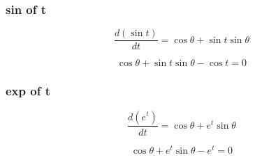 \documentclass{article}
\begin{document}
\subsubsection{sin of t}

\begin{equation}
    \frac{d(\sin t)}{dt} = \cos \theta + \sin t \sin \theta
\end{equation}

\begin{equation}
     \cos \theta + \sin t \sin \theta - \cos t = 0
\end{equation}

\subsubsection{exp of t}

\begin{equation}
    \frac{d(e^t)}{dt} = \cos \theta + e^t \sin \theta
\end{equation}

\begin{equation}
     \cos \theta + e^t \sin \theta - e^t = 0
\end{equation}
\end{document}

